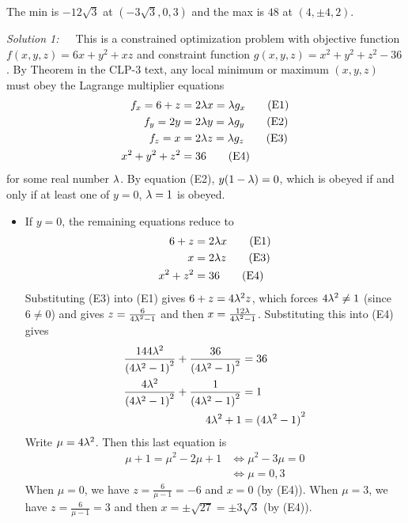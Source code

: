 \begin{answer}
The min is $-12\sqrt{3}$ at $(-3\sqrt{3},0,3)$
and the max is $48$ at $(4,\pm 4,2)$.
\end{answer}

\begin{solution}
\emph{Solution 1:}\ \ \ 
This is a constrained optimization problem with objective function
$f(x,y,z) = 6 x +y^2 +xz$ and constraint function $g(x,y,z) =x^2+y^2+z^2-36$.
By Theorem \eref{CLP200}{thm Lagrange} in the CLP-3 text, any local minimum
or maximum $(x,y,z)$ must obey the  Lagrange multiplier equations
\begin{align*}
f_x = 6+z &=2 \lambda x = \lambda g_x \tag{E1} \\ 
f_y = 2y &=2 \lambda y = \lambda g_y \tag{E2} \\ 
f_z = x &=2 \lambda z = \lambda g_z \tag{E3} \\ 
x^2 + y^2 + z^2 &= 36 \tag{E4}
\end{align*}
for some real number $\lambda$. By equation (E2), $y(1-\lambda)=0$, which is
obeyed if and only if at least one of $y=0$, $\lambda=1$ is obeyed.
\begin{itemize}
\item 
If $y=0$, the remaining equations reduce to
\begin{align*}
6+z &=2 \lambda x  \tag{E1} \\ 
x &=2 \lambda z \tag{E3} \\ 
x^2  + z^2 &= 36 \tag{E4}
\end{align*}
Substituting (E3) into (E1) gives $6 + z = 4\lambda^ 2 z$, 
which forces $4\lambda^2\ne 1$ (since $6\ne 0$)
and gives $z = \frac{6}{4\lambda^2-1}$ and then 
$x=\frac{12\lambda}{4\lambda^2-1}$. Substituting this into (E4) gives
\begin{align*}
\frac{144\lambda^2}{{(4\lambda^2-1)}^2} +\frac{36}{{(4\lambda^2-1)}^2}&=36 \\
\frac{4\lambda^2}{{(4\lambda^2-1)}^2} +\frac{1}{{(4\lambda^2-1)}^2}&=1 \\
4\lambda^2+1 &= {(4\lambda^2-1)}^2 
\end{align*}
Write $\mu=4\lambda^2$. Then this last equation is
\begin{align*}
\mu+1 = \mu^2 -2\mu +1
&\iff \mu^2-3\mu =0 \\
&\iff \mu=0,3
\end{align*}
When $\mu=0$, we have $z=\frac{6}{\mu-1}=-6$ and $x=0$ (by (E4)).
When $\mu=3$, we have $z=\frac{6}{\mu-1}=3$ and then $x=\pm \sqrt{27}
=\pm 3\sqrt{3}$ (by (E4)).


\end{itemize}
\end{solution}

